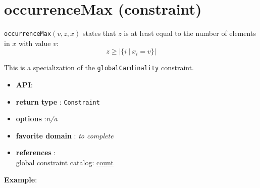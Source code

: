 \label{occurrencemax}
\hypertarget{occurrencemax}{}

\section{occurrenceMax (constraint)}\label{occurrencemax:occurrencemaxconstraint}\hypertarget{occurrencemax:occurrencemaxconstraint}{}
\begin{notedef}
  \texttt{occurrenceMax}$(v,z,x)$ states that $z$ is at least equal to the number of elements in $x$ with value $v$:
$$z\ge|\{i\ |\ x_i=v\}|$$   
\end{notedef}
  This is a specialization of the \texttt{globalCardinality} constraint.

\begin{itemize}
	\item \textbf{API}: 
	\item \textbf{return type} : \texttt{Constraint}
	\item \textbf{options} :\emph{n/a}
	\item \textbf{favorite domain} : \emph{to complete}
	\item \textbf{references} :\\
      global constraint catalog: \href{http://www.emn.fr/x-info/sdemasse/gccat/Ccount.html}{count}
\end{itemize}

\textbf{Example}:

